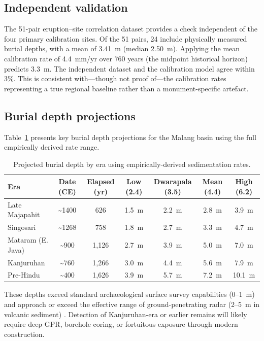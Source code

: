 \documentclass[12pt,a4paper]{article}
\begin{document}
\subsection{Independent validation}

The 51-pair eruption--site correlation dataset provides a check independent of the four primary calibration sites. Of the 51 pairs, 24 include physically measured burial depths, with a mean of 3.41~m (median 2.50~m). Applying the mean calibration rate of 4.4~mm/yr over 760 years (the midpoint historical horizon) predicts 3.3~m. The independent dataset and the calibration model agree within 3\%. This is consistent with---though not proof of---the calibration rates representing a true regional baseline rather than a monument-specific artefact.

\subsection{Burial depth projections}

Table~\ref{tab:depth} presents key burial depth projections for the Malang basin using the full empirically derived rate range.

\begin{table}[t]
\caption{Projected burial depth by era using empirically-derived sedimentation rates.}
\label{tab:depth}
\begin{tabular}{lcccccc}
\toprule
Era & Date (CE) & Elapsed (yr) & Low (2.4) & Dwarapala (3.5) & Mean (4.4) & High (6.2) \\
\midrule
Late Majapahit & \textasciitilde1400 & 626 & 1.5~m & 2.2~m & 2.8~m & 3.9~m \\
Singosari & \textasciitilde1268 & 758 & 1.8~m & 2.7~m & 3.3~m & 4.7~m \\
Mataram (E. Java) & \textasciitilde900 & 1,126 & 2.7~m & 3.9~m & 5.0~m & 7.0~m \\
Kanjuruhan & \textasciitilde760 & 1,266 & 3.0~m & 4.4~m & 5.6~m & 7.9~m \\
Pre-Hindu & \textasciitilde400 & 1,626 & 3.9~m & 5.7~m & 7.2~m & 10.1~m \\
\bottomrule
\end{tabular}
\end{table}

These depths exceed standard archaeological surface survey capabilities (0--1~m) and approach or exceed the effective range of ground-penetrating radar (2--5~m in volcanic sediment) \citep{conyers2004,goodman2013}. Detection of Kanjuruhan-era or earlier remains will likely require deep GPR, borehole coring, or fortuitous exposure through modern construction.
\end{document}
